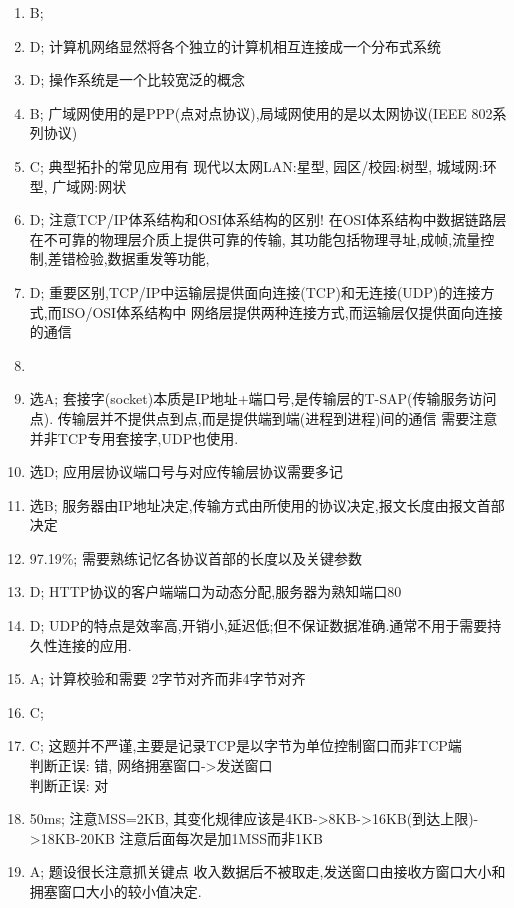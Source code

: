 \documentclass[12pt, a4paper, oneside, UTF8]{ctexbook}
\begin{document}
\begin{enumerate}
    \item B;
    \item D; 计算机网络显然将各个独立的计算机相互连接成一个分布式系统
    \item D; 操作系统是一个比较宽泛的概念
    \item B; 广域网使用的是PPP(点对点协议),局域网使用的是以太网协议(IEEE 802系列协议)
    \item C; 典型拓扑的常见应用有 {\color{red} 现代以太网LAN:星型, 园区/校园:树型, 城域网:环型, 广域网:网状}
    \item D; 注意TCP/IP体系结构和OSI体系结构的区别! 在OSI体系结构中数据链路层在不可靠的物理层介质上提供可靠的传输,
    其功能包括物理寻址,成帧,流量控制,差错检验,数据重发等功能,
    \item D; {\color{red} 重要区别,TCP/IP中运输层提供面向连接(TCP)和无连接(UDP)的连接方式,而ISO/OSI体系结构中
    网络层提供两种连接方式,而运输层仅提供面向连接的通信}
    \item 
    \item 选A; 套接字(socket)本质是IP地址+端口号,是传输层的T-SAP(传输服务访问点). 传输层并不提供{\color{red}点到点,而是提供端到端(进程到进程)间的通信}
    需要注意并非TCP专用套接字,UDP也使用. 
    \item 选D; 应用层协议端口号与对应传输层协议需要多记
    \item 选B; 服务器由IP地址决定,传输方式由所使用的协议决定,报文长度由报文首部决定
    \item 97.19\%; 需要熟练记忆各协议首部的长度以及关键参数 
    \item D; HTTP协议的客户端端口为动态分配,服务器为熟知端口80
    \item D; UDP的特点是效率高,开销小,延迟低;但不保证数据准确.通常不用于需要持久性连接的应用.
    \item A; 计算校验和需要{\color{red} 2字节对齐而非4字节对齐} 
    \item C;
    \item C; 这题并不严谨,主要是记录TCP是以字节为单位控制窗口而非TCP端 \\
    判断正误: 错, 网络拥塞窗口->发送窗口 \\
    判断正误: 对
    \item 50ms; 注意MSS=2KB, 其变化规律应该是4KB->8KB->16KB(到达上限)->18KB-20KB 注意后面每次是加1MSS而非1KB
    \item A; 题设很长注意抓关键点{\color{red} 收入数据后不被取走},发送窗口由接收方窗口大小和拥塞窗口大小的较小值决定.
\end{enumerate}
\end{document}
